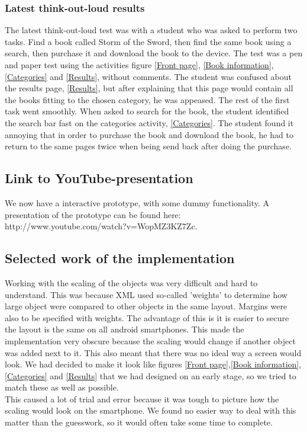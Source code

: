 \documentclass[12pt]{article}
\begin{document}
\subsubsection{Latest think-out-loud results}
The latest think-out-loud test was with a student who was asked to perform two tasks. Find a book called Storm of the Sword, then find the same book using a search, then purchase it and download the book to the device. The test was a pen and paper test using the activities figure  \ref{Front page}, \ref{Book information}, \ref{Categories} and \ref{Results}, without comments. The student was confused about the results page, \ref{Results}, but after explaining that this page would contain all the books fitting to the chosen category, he was appeased. The rest of the first task went smoothly. When asked to search for the book, the student identified the search bar fast on the categories
activity, \ref{Categories}. The student found it annoying that in order to purchase the book and download the book, he had to return to the same pages twice when being send back after doing the purchase.

\subsection{Link to YouTube-presentation}
We now have a interactive prototype, with some dummy functionality. A presentation of the prototype can be found here: http://www.youtube.com/watch?v=WopMZ3KZ7Zc.

\subsection{Selected work of the implementation}
Working with the scaling of the objects was very difficult and hard to understand. This was because XML used so-called 'weights' to determine how large object were compared to other objects in the same layout. Margins were also to be specified with weights. The advantage of this is it is easier to secure the layout is the same on all android smartphones. This made the implementation very obscure because the scaling would change if another object was added next to it. This also meant that there was no ideal way a screen would look. We had decided to make it look like figures \ref{Front page},\ref{Book information},\ref{Categories} and \ref{Results} that we had designed on an early stage, so we tried to match these as well as possible.\\
This caused a lot of trial and error because it was tough to picture how the scaling would look on the smartphone. We found no easier way to deal with this matter than the guesswork, so it would often take some time to complete.
\end{document}
